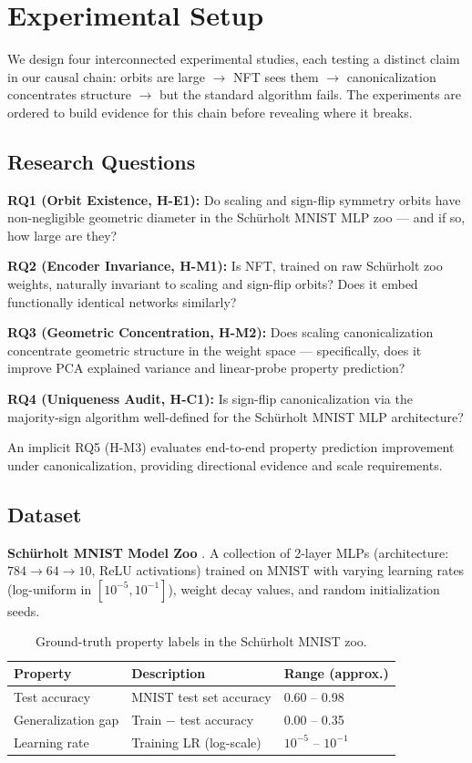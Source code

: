 \section{Experimental Setup}
\label{sec:experiments}

We design four interconnected experimental studies, each testing a distinct claim in our causal chain: orbits are large $\to$ NFT sees them $\to$ canonicalization concentrates structure $\to$ but the standard algorithm fails. The experiments are ordered to build evidence for this chain before revealing where it breaks.

\subsection{Research Questions}

\textbf{RQ1 (Orbit Existence, H-E1):} Do scaling and sign-flip symmetry orbits have non-negligible geometric diameter in the Schürholt MNIST MLP zoo --- and if so, how large are they?

\textbf{RQ2 (Encoder Invariance, H-M1):} Is NFT, trained on raw Schürholt zoo weights, naturally invariant to scaling and sign-flip orbits? Does it embed functionally identical networks similarly?

\textbf{RQ3 (Geometric Concentration, H-M2):} Does scaling canonicalization concentrate geometric structure in the weight space --- specifically, does it improve PCA explained variance and linear-probe property prediction?

\textbf{RQ4 (Uniqueness Audit, H-C1):} Is sign-flip canonicalization via the majority-sign algorithm well-defined for the Schürholt MNIST MLP architecture?

An implicit RQ5 (H-M3) evaluates end-to-end property prediction improvement under canonicalization, providing directional evidence and scale requirements.

\subsection{Dataset}

\textbf{Schürholt MNIST Model Zoo} \citep{Schurholt2022ModelZoos}. A collection of 2-layer MLPs (architecture: $784 \to 64 \to 10$, ReLU activations) trained on MNIST with varying learning rates (log-uniform in $[10^{-5}, 10^{-1}]$), weight decay values, and random initialization seeds.

\begin{table}[h]
\centering
\caption{Ground-truth property labels in the Schürholt MNIST zoo.}
\label{tab:properties}
\begin{tabular}{lll}
\toprule
Property & Description & Range (approx.) \\
\midrule
Test accuracy & MNIST test set accuracy & 0.60 -- 0.98 \\
Generalization gap & Train $-$ test accuracy & 0.00 -- 0.35 \\
Learning rate & Training LR (log-scale) & $10^{-5}$ -- $10^{-1}$ \\
\bottomrule
\end{tabular}
\end{table}

